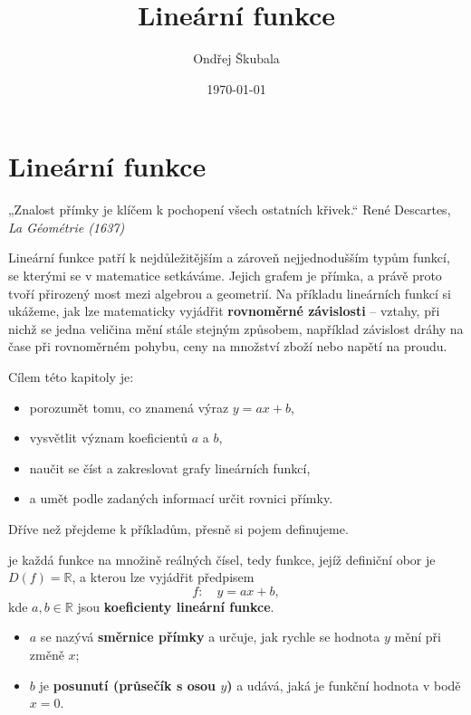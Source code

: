 \documentclass[12pt,a4paper]{article}
\title{Lineární funkce}
\author{Ondřej Škubala}
\date{\today}
\begin{document}
\maketitle
\newpage



\section{Lineární funkce}

\begin{quotebox}
{„Znalost přímky je klíčem k pochopení všech ostatních křivek.“}
{René Descartes, \textit{La Géométrie (1637)}}
\end{quotebox}

Lineární funkce patří k nejdůležitějším a zároveň nejjednodušším typům funkcí, se kterými se v matematice setkáváme.  
Jejich grafem je přímka, a právě proto tvoří přirozený most mezi algebrou a geometrií.  
Na příkladu lineárních funkcí si ukážeme, jak lze matematicky vyjádřit \textbf{rovnoměrné závislosti} – vztahy, při nichž se jedna veličina mění stále stejným způsobem, například závislost dráhy na čase při rovnoměrném pohybu, ceny na množství zboží nebo napětí na proudu.

Cílem této kapitoly je:
\begin{itemize}
    \item porozumět tomu, co znamená výraz \(y = ax + b\),
    \item vysvětlit význam koeficientů \(a\) a \(b\),
    \item naučit se číst a zakreslovat grafy lineárních funkcí,
    \item a umět podle zadaných informací určit rovnici přímky.
\end{itemize}

Dříve než přejdeme k příkladům, přesně si pojem  definujeme.

\begin{definitionbox}
 je každá funkce na množině reálných čísel, tedy funkce, jejíž definiční obor je \(D(f) = \mathbb{R}\),  
a kterou lze vyjádřit předpisem
\[
f:\quad y = ax + b,
\]
kde \(a, b \in \mathbb{R}\) jsou \textbf{koeficienty lineární funkce}.  

\begin{itemize}
    \item \(a\) se nazývá \textbf{směrnice přímky} a určuje, jak rychle se hodnota \(y\) mění při změně \(x\);
    \item \(b\) je \textbf{posunutí (průsečík s osou \(y\))} a udává, jaká je funkční hodnota v bodě \(x=0\).
\end{itemize}
\end{definitionbox}
\end{document}
